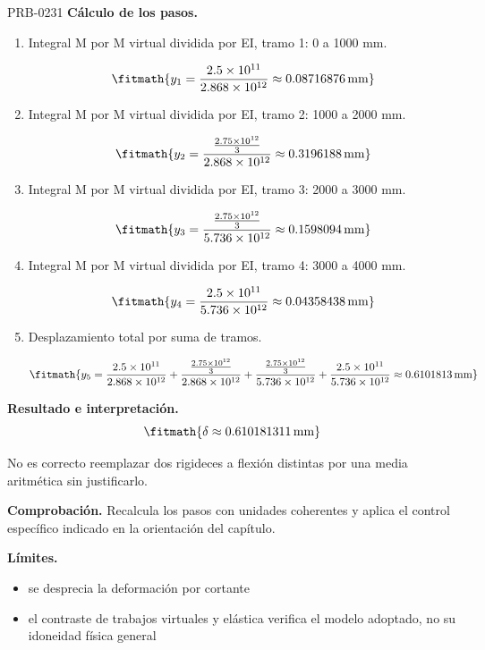 \begin{studiumworked}{PRB-0231}
\textbf{Cálculo de los pasos.}

\begin{enumerate}

\item Integral M por M virtual dividida por EI, tramo 1: 0 a 1000 mm.

\[\fitmath{y_{1}=\frac{2.5\times10^{11}}{2.868\times10^{12}}\approx 0.08716876\,\mathrm{mm}}\]

\item Integral M por M virtual dividida por EI, tramo 2: 1000 a 2000 mm.

\[\fitmath{y_{2}=\frac{\frac{2.75\times10^{12}}{3}}{2.868\times10^{12}}\approx 0.3196188\,\mathrm{mm}}\]

\item Integral M por M virtual dividida por EI, tramo 3: 2000 a 3000 mm.

\[\fitmath{y_{3}=\frac{\frac{2.75\times10^{12}}{3}}{5.736\times10^{12}}\approx 0.1598094\,\mathrm{mm}}\]

\item Integral M por M virtual dividida por EI, tramo 4: 3000 a 4000 mm.

\[\fitmath{y_{4}=\frac{2.5\times10^{11}}{5.736\times10^{12}}\approx 0.04358438\,\mathrm{mm}}\]

\item Desplazamiento total por suma de tramos.

\[\fitmath{y_{5}=\frac{2.5\times10^{11}}{2.868\times10^{12}}+\frac{\frac{2.75\times10^{12}}{3}}{2.868\times10^{12}}+\frac{\frac{2.75\times10^{12}}{3}}{5.736\times10^{12}}+\frac{2.5\times10^{11}}{5.736\times10^{12}}\approx 0.6101813\,\mathrm{mm}}\]

\end{enumerate}

\textbf{Resultado e interpretación.}\[\fitmath{\delta \approx 0.610181311\,\mathrm{mm}}\]

No es correcto reemplazar dos rigideces a flexión distintas por una media aritmética sin justificarlo.

\par\textbf{Comprobación.} Recalcula los pasos con unidades coherentes y aplica el control específico indicado en la orientación del capítulo.

\par\noindent\begin{minipage}{\linewidth}

\textbf{Límites.}\begin{itemize}\item se desprecia la deformación por cortante
\item el contraste de trabajos virtuales y elástica verifica el modelo adoptado, no su idoneidad física general\end{itemize}


\end{minipage}
\end{studiumworked}
